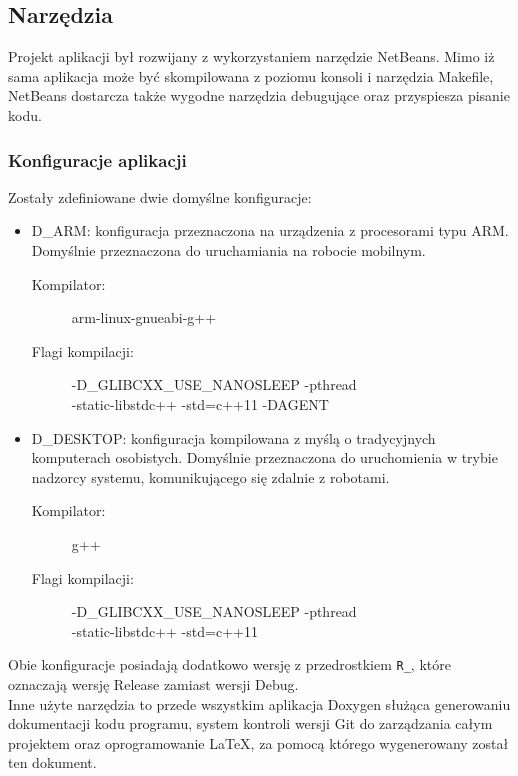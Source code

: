\subsection{Narzędzia}
Projekt aplikacji był rozwijany z wykorzystaniem narzędzie NetBeans. Mimo iż sama aplikacja może być skompilowana z poziomu konsoli i narzędzia Makefile, NetBeans dostarcza także wygodne narzędzia debugujące oraz przyspiesza pisanie kodu.

\subsubsection{Konfiguracje aplikacji}
Zostały zdefiniowane dwie domyślne konfiguracje:
\begin{itemize}
    \item D\_ARM: konfiguracja przeznaczona na urządzenia z procesorami typu ARM. Domyślnie przeznaczona do uruchamiania na robocie mobilnym.
    \begin{description}
        \item[{\small Kompilator:}] {\small arm-linux-gnueabi-g++}
        \item[{\small Flagi kompilacji:}] {\small -D\_GLIBCXX\_USE\_NANOSLEEP -pthread\\ -static-libstdc++ -std=c++11 -DAGENT}
    \end{description}
    \item D\_DESKTOP: konfiguracja kompilowana z myślą o tradycyjnych komputerach osobistych. Domyślnie przeznaczona do uruchomienia w trybie nadzorcy systemu, komunikującego się zdalnie z robotami.
    \begin{description}
        \item[{\small Kompilator:}] {\small g++}
        \item[{\small Flagi kompilacji:}] {\small -D\_GLIBCXX\_USE\_NANOSLEEP -pthread\\ -static-libstdc++ -std=c++11}
    \end{description}
\end{itemize}
\noindent Obie konfiguracje posiadają dodatkowo wersję z przedrostkiem {\tt R\_}, które oznaczają wersję Release zamiast wersji Debug.\\

Inne użyte narzędzia to przede wszystkim aplikacja Doxygen służąca generowaniu dokumentacji kodu programu, system kontroli wersji Git do zarządzania całym projektem oraz oprogramowanie LaTeX, za pomocą którego wygenerowany został ten dokument.

